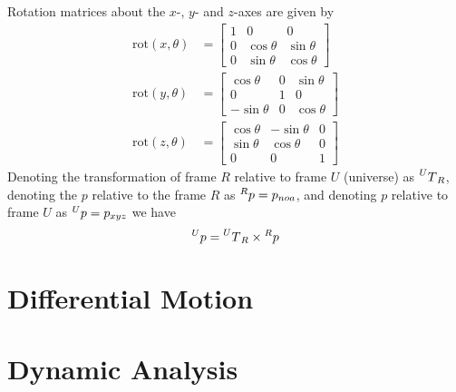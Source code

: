 \documentclass[11pt]{book}
\begin{document}
Rotation matrices about the $x$-, $y$- and $z$-axes are given by
\begin{equation}
	\begin{aligned}
		\mathrm{rot}(x,\theta)&=
		\begin{bmatrix}
			1&0&0\\
			0&\cos{\theta}&\sin{\theta}\\
			0&\sin{\theta}&\cos{\theta}
		\end{bmatrix}\\
		\mathrm{rot}(y,\theta)&=
		\begin{bmatrix}
			\cos{\theta}&0&\sin{\theta}\\
			0&1&0\\
			-\sin{\theta}&0&\cos{\theta}
		\end{bmatrix}\\
		\mathrm{rot}(z,\theta)&=
		\begin{bmatrix}
			\cos{\theta}&-\sin{\theta}&0\\
			\sin{\theta}&\cos{\theta}&0\\
			0&0&1
		\end{bmatrix}
	\end{aligned}
\end{equation}
Denoting the transformation of frame $R$ relative to frame $U$ (universe) as $\prescript{U}{}T_R$, denoting the $p$ relative to the frame $R$ as $\prescript{R}{}p=p_{noa}$, and denoting $p$ relative to frame $U$ as $\prescript{U}{}p=p_{xyz}$ we have
\begin{equation}
	\prescript{U}{}p=\prescript{U}{}T_R\times\prescript{R}{}p
\end{equation}

\section{Differential Motion}

\section{Dynamic Analysis}
\end{document}
